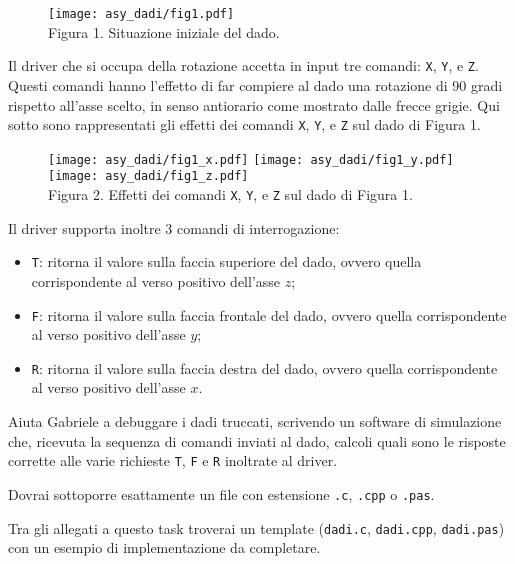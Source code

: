 \begin{figure}[H]
	\centering\texttt{[image: asy\_dadi/fig1.pdf]}\\[2mm]
	Figura 1. Situazione iniziale del dado.
\end{figure}

Il driver che si occupa della rotazione accetta in input tre comandi: \texttt{X}, \texttt{Y}, e \texttt{Z}. Questi comandi hanno l'effetto di far compiere al dado una rotazione di 90 gradi rispetto all'asse scelto, in senso antiorario come mostrato dalle frecce grigie. Qui sotto sono rappresentati gli effetti dei comandi \texttt{X}, \texttt{Y}, e \texttt{Z} sul dado di Figura 1.

\begin{figure}[H]
	\centering
	\texttt{[image: asy\_dadi/fig1\_x.pdf]}\hspace{1cm}
	\texttt{[image: asy\_dadi/fig1\_y.pdf]}\hspace{1cm}
	\texttt{[image: asy\_dadi/fig1\_z.pdf]}\\[2mm]
	Figura 2. Effetti dei comandi \texttt{X}, \texttt{Y}, e \texttt{Z} sul dado di Figura 1.
\end{figure}

Il driver supporta inoltre 3 comandi di interrogazione:
\begin{itemize}[nolistsep, itemsep=2mm]
	\item \texttt{T}: ritorna il valore sulla faccia superiore del dado, ovvero quella corrispondente al verso positivo dell'asse $z$;
	\item \texttt{F}: ritorna il valore sulla faccia frontale del dado, ovvero quella corrispondente al verso positivo dell'asse $y$;
	\item \texttt{R}: ritorna il valore sulla faccia destra del dado, ovvero quella corrispondente al verso positivo dell'asse $x$.
\end{itemize}

Aiuta Gabriele a debuggare i dadi truccati, scrivendo un software di simulazione che, ricevuta la sequenza di comandi inviati al dado, calcoli quali sono le risposte corrette alle varie richieste \texttt{T}, \texttt{F} e \texttt{R} inoltrate al driver.

\Implementation
Dovrai sottoporre esattamente un file con estensione \texttt{.c}, \texttt{.cpp} o \texttt{.pas}.

\begin{warning}
Tra gli allegati a questo task troverai un template (\texttt{dadi.c}, \texttt{dadi.cpp}, \texttt{dadi.pas}) con un esempio di implementazione da completare.
\end{warning}

